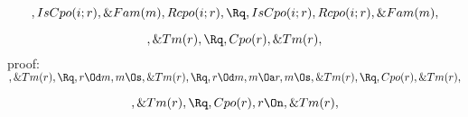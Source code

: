 \[, IsCpo(i;r), \&Fam(m), Rcpo(i;r), \Rq , IsCpo(i;r), Rcpo(i;r), \&Fam(m),\]

\bigskip
\bigskip

\[, \&Tm(r), \Rq , Cpo(r), \&Tm(r), \]
\bigskip
\bigskip
proof:\\
\begin{math} 
, \&Tm(r),\\\\
\Rq, r \Od m, m \Os, \&Tm(r),\\\\
\Rq, r \Od m, m \Oa r, m \Os, \&Tm(r),\\\\
\Rq, Cpo(r), \&Tm(r),
\end{math}


\[, \&Tm(r), \Rq , Cpo(r), r \On, \&Tm(r), \]


